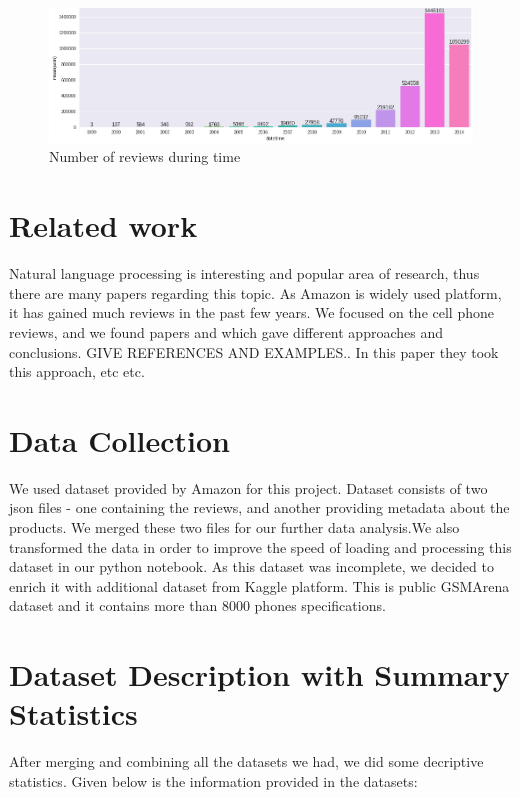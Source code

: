 \documentclass[11pt]{article}
\begin{document}
\begin{figure}[h!]
  \centering
    \includegraphics[width=\linewidth]{reviewsByTime.png}
  \caption{Number of reviews during time}
  \label{fig:reviewsByTime}
\end{figure}


\section{Related work}
Natural language processing is interesting and popular area of research, thus there are many papers regarding this topic. As Amazon is widely used platform, it has gained much reviews in the past few years. We focused on the cell phone reviews, and we found papers and which gave different approaches and conclusions. GIVE REFERENCES AND EXAMPLES.. In this paper they took this approach, etc etc.


\section{Data Collection}
We used dataset provided by Amazon for this project. Dataset consists of two json files - one containing the reviews, and another providing metadata about the products. We merged these two files for our further data analysis.We also transformed the data in order to improve the speed of loading and processing this dataset in our python notebook. As this dataset was incomplete, we decided to enrich it with additional dataset from Kaggle platform. This is public GSMArena dataset and it contains more than 8000 phones specifications.


\section{Dataset Description with Summary Statistics}
After merging and combining all the datasets we had, we did some decriptive statistics. Given below is the information provided in the datasets:
\end{document}
